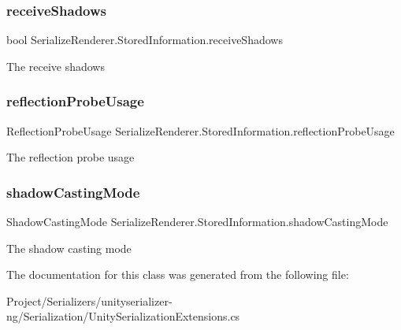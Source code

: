 \subsubsection{\texorpdfstring{receive\+Shadows}{receiveShadows}}
{\footnotesize\ttfamily bool Serialize\+Renderer.\+Stored\+Information.\+receive\+Shadows}



The receive shadows 

\mbox{\label{class_serialize_renderer_1_1_stored_information_afa342328b7555a7565d9eae3060dfcea}} 
\subsubsection{\texorpdfstring{reflection\+Probe\+Usage}{reflectionProbeUsage}}
{\footnotesize\ttfamily Reflection\+Probe\+Usage Serialize\+Renderer.\+Stored\+Information.\+reflection\+Probe\+Usage}



The reflection probe usage 

\mbox{\label{class_serialize_renderer_1_1_stored_information_afbd4ac83383a2cf02b87098c6092e94b}} 
\subsubsection{\texorpdfstring{shadow\+Casting\+Mode}{shadowCastingMode}}
{\footnotesize\ttfamily Shadow\+Casting\+Mode Serialize\+Renderer.\+Stored\+Information.\+shadow\+Casting\+Mode}



The shadow casting mode 



The documentation for this class was generated from the following file\+:\begin{DoxyCompactItemize}
\item 
Project/\+Serializers/unityserializer-\/ng/\+Serialization/Unity\+Serialization\+Extensions.\+cs\end{DoxyCompactItemize}

